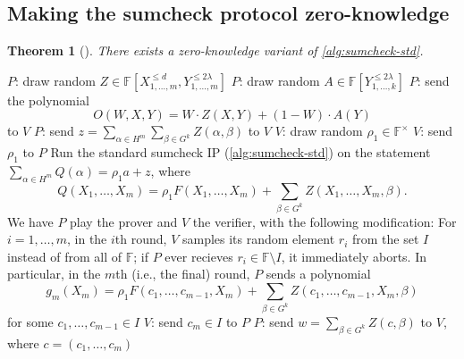 \documentclass[english,12pt]{reedthesis}
\theoremstyle{plain}
\newtheorem{thm}{Theorem}[section]
\theoremstyle{definition}
\theoremstyle{remark}
\begin{document}
\subsection{Making the sumcheck protocol zero-knowledge}

\begin{thm}[{\cite[Theorem 13.3]{CFGS22}}]\label{thm:zk-sumcheck}
  There exists a zero-knowledge variant of \cref{alg:sumcheck-std}.
\end{thm}

\begin{algorithm}[htbp]
  $P$: draw random
  $Z \in \mathbb{F}[X_{1, \ldots, m}^{\le d}, Y_{1, \ldots, m}^{\le 2\lambda}]$\;
  $P$: draw random $A \in \mathbb{F}[Y_{1, \ldots, k}^{\le 2\lambda}]$\;
  $P$: send the polynomial
  \[
    O(W, X, Y) = W \cdot Z(X, Y) + (1 - W) \cdot A(Y)
  \]
  to $V$\;
  $P$: send $z = \sum_{\alpha \in H^{m}}\sum_{\beta \in G^{k}}Z(\alpha, \beta)$ to $V$\;
  $V$: draw random $\rho_{1} \in \mathbb{F}^{\times}$\;
  $V$: send $\rho_{1}$ to $P$\;
  Run the standard sumcheck IP (\cref{alg:sumcheck-std}) on the statement
  $\sum_{\alpha \in H^{m}}Q(\alpha) = \rho_{1}a + z$, where
  \[
    Q(X_{1}, \ldots, X_{m}) = \rho_{1}F(X_{1}, \ldots, X_{m}) + \sum_{\beta \in G^{k}}Z(X_{1}, \ldots, X_{m}, \beta).
  \]
  We have $P$ play the prover and $V$ the verifier, with the following
  modification: For $i = 1, \ldots, m$, in the $i$th round, $V$ samples its random
  element $r_{i}$ from the set $I$ instead of from all of $\mathbb{F}$; if $P$
  ever recieves $r_{i} \in \mathbb{F} \setminus I$, it immediately aborts. In particular,
  in the $m$th (i.e., the final) round, $P$ sends a polynomial
  \[
    g_{m}(X_{m}) = \rho_{1}F(c_{1}, \ldots, c_{m-1}, X_{m}) + \sum_{\beta \in G^{k}}Z(c_{1}, \ldots, c_{m-1}, X_{m}, \beta)
  \]
  for some $c_{1}, \ldots, c_{m-1} \in I$\;
  $V$: send $c_{m} \in I$ to $P$\;
  $P$: send $w = \sum_{\beta \in G^{k}}Z(c, \beta)$ to $V$, where $c = (c_{1}, \ldots, c_{m})$\;

\end{algorithm}
\end{document}
